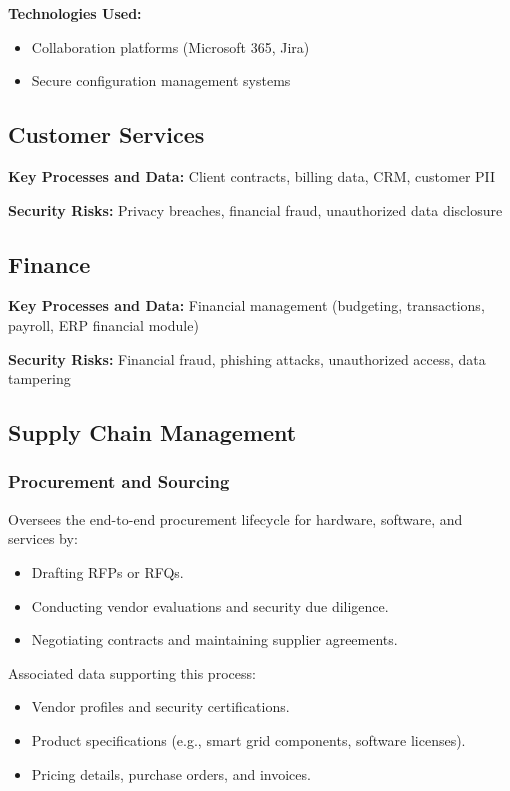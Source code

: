 \textbf{Technologies Used:}
\begin{itemize}
    \item Collaboration platforms (Microsoft 365, Jira)
    \item Secure configuration management systems
\end{itemize}

\subsection{Customer Services}
\textbf{Key Processes and Data:} Client contracts, billing data, \ac{CRM}, customer \ac{PII}

\textbf{Security Risks:} Privacy breaches, financial fraud, unauthorized data disclosure

\subsection{Finance}
\textbf{Key Processes and Data:} Financial management (budgeting, transactions, payroll, 
\ac{ERP} financial module)  

\textbf{Security Risks:} Financial fraud, phishing attacks, unauthorized access, data tampering

\subsection{Supply Chain Management}

\subsubsection{Procurement and Sourcing}
Oversees the end-to-end procurement lifecycle for hardware, software, and services by:
\begin{itemize}
    \item Drafting \ac{RFPs} or \ac{RFQs}.
    \item Conducting vendor evaluations and security due diligence.
    \item Negotiating contracts and maintaining supplier agreements.
\end{itemize}
\noindent
Associated data supporting this process:
\begin{itemize}
    \item Vendor profiles and security certifications.
    \item Product specifications (e.g., smart grid components, software licenses).
    \item Pricing details, purchase orders, and invoices.
\end{itemize}

